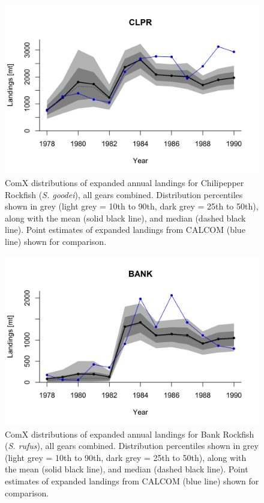 \documentclass[12pt]{article}
\begin{document}
%
\clearpage
%

\begin{landscape}
\begin{figure}
\centering
\vspace{-2cm}
\includegraphics[width=1.3\textwidth]{./pictures/sp-yr/CLPR.png}
\caption{ComX distributions of expanded annual landings for Chilipepper Rockfish 
(\textit{S. goodei}), all gears combined. Distribution percentiles shown in grey 
(light grey = 10th to 90th, dark grey = 25th to 50th), along with the mean 
(solid black line), and median (dashed black line). Point estimates of 
expanded landings from CALCOM (blue line) shown for comparison.}
\label{Y3}
\end{figure}
\end{landscape}

%
\clearpage
%

\begin{landscape}
\begin{figure}
\centering
\vspace{-2cm}
\includegraphics[width=1.3\textwidth]{./pictures/sp-yr/BANK.png}
\caption{ComX distributions of expanded annual landings for Bank Rockfish 
(\textit{S. rufus}), all gears combined. Distribution percentiles shown in grey 
(light grey = 10th to 90th, dark grey = 25th to 50th), along with the mean 
(solid black line), and median (dashed black line). Point estimates of 
expanded landings from CALCOM (blue line) shown for comparison.}
\label{Y4}
\end{figure}
\end{landscape}
\end{document}
